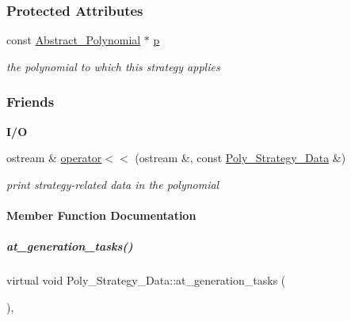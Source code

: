 \subsubsection*{Protected Attributes}
\begin{DoxyCompactItemize}
\item 
\mbox{\label{group__strategygroup_a2fdcdbe5f8ea3ae93c5a55a9775e6e6f}} 
const \hyperlink{group__polygroup_class_abstract___polynomial}{Abstract\+\_\+\+Polynomial} $\ast$ \hyperlink{group__strategygroup_a2fdcdbe5f8ea3ae93c5a55a9775e6e6f}{p}
\begin{DoxyCompactList}\small\item\em the polynomial to which this strategy applies \end{DoxyCompactList}\end{DoxyCompactItemize}
\subsubsection*{Friends}
\begin{Indent}\textbf{ I/O}\par
\begin{DoxyCompactItemize}
\item 
\mbox{\label{group__strategygroup_a10f553f550739a68fe90fa3318942134}} 
ostream \& \hyperlink{group__strategygroup_a10f553f550739a68fe90fa3318942134}{operator$<$$<$} (ostream \&, const \hyperlink{group__strategygroup_class_poly___strategy___data}{Poly\+\_\+\+Strategy\+\_\+\+Data} \&)
\begin{DoxyCompactList}\small\item\em print strategy-\/related data in the polynomial \end{DoxyCompactList}\end{DoxyCompactItemize}
\end{Indent}


\paragraph{Member Function Documentation}
\mbox{\label{group__strategygroup_a3c2e31f0e3323da59564edc6ee3557af}} 
\subparagraph{\texorpdfstring{at\+\_\+generation\+\_\+tasks()}{at\_generation\_tasks()}\hspace{0.1cm}{\footnotesize\ttfamily [1/2]}}
{\footnotesize\ttfamily virtual void Poly\+\_\+\+Strategy\+\_\+\+Data\+::at\+\_\+generation\+\_\+tasks (\begin{DoxyParamCaption}{ }\end{DoxyParamCaption})\hspace{0.3cm}{\ttfamily [inline]}, {\ttfamily [virtual]}}



